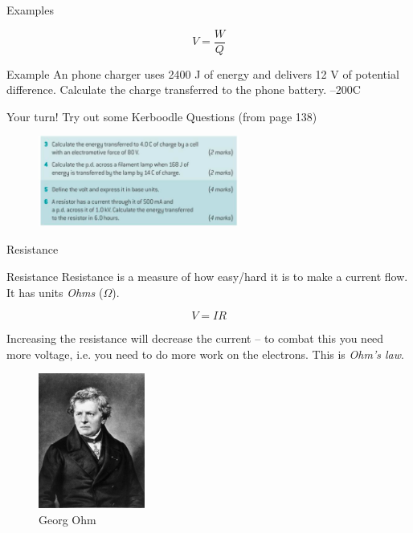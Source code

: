 \documentclass[../Main.tex]{subfiles}
\begin{document}
\begin{frame}{Examples}

\begin{equation*}
    V=\frac{W}{Q}
\end{equation*}
    \begin{exampleblock}{Example}
    An phone charger uses 2400 J of energy and delivers 12 V of potential difference. Calculate the charge transferred to the phone battery. \newline \pause
    --200C
    \end{exampleblock}
    
    \pause 
    Your turn! Try out some Kerboodle Questions (from page 138)
    \begin{figure}
        \centering
        \includegraphics[height=3cm]{Electricity_Images/kerboodle_Qs_voltage.png}
    \end{figure}
\end{frame}

\begin{frame}{Resistance}
    \begin{block}{Resistance}
    Resistance is a measure of how easy/hard it is to make a current flow. It has units \emph{Ohms} ($\Omega$).
    \end{block}
    \begin{multicols}{2}
    \begin{equation*}
        V=IR
    \end{equation*}
    
     Increasing the resistance will decrease the current -- to combat this you need more voltage, i.e. you need to do more work on the electrons. This is \emph{Ohm's law}.
\columnbreak
     \begin{figure}
         \centering
         \includegraphics[width=3.5cm]{Electricity_Images/Georg_Simon_Ohm.jpg}
         \caption{Georg Ohm}
     \end{figure}
     \end{multicols}
\end{frame}
\end{document}
